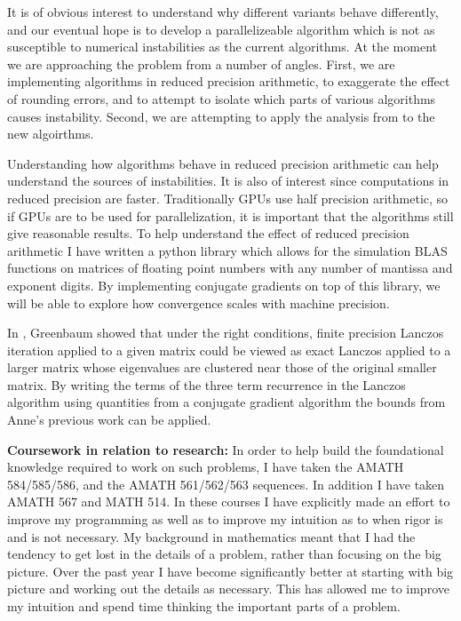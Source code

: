 \documentclass[11pt]{article}
\begin{document}
It is of obvious interest to understand why different variants behave differently, and our eventual hope is to develop a parallelizeable algorithm which is not as susceptible to numerical instabilities as the current algorithms. At the moment we are approaching the problem from a number of angles. First, we are implementing algorithms in reduced precision arithmetic, to exaggerate the effect of rounding errors, and to attempt to isolate which parts of various algorithms causes instability. Second, we are attempting to apply the analysis from \cite{perturbed_lanczos} to the new algoirthms.

Understanding how algorithms behave in reduced precision arithmetic can help understand the sources of instabilities. It is also of interest since computations in reduced precision are faster. Traditionally GPUs use half precision arithmetic, so if GPUs are to be used for parallelization, it is important that the algorithms still give reasonable results. To help understand the effect of reduced precision arithmetic I have written a python library which allows for the simulation BLAS functions on matrices of floating point numbers with any number of mantissa and exponent digits. By implementing conjugate gradients on top of this library, we will be able to explore how convergence scales with machine precision.


In \cite{perturbed_lanczos}, Greenbaum showed that under the right conditions, finite precision Lanczos iteration applied to a given matrix could be viewed as exact Lanczos applied to a larger matrix whose eigenvalues are clustered near those of the original smaller matrix. By writing the terms of the three term recurrence in the Lanczos algorithm using quantities from a conjugate gradient algorithm the bounds from Anne's previous work can be applied.



\textbf{Coursework in relation to research:}
In order to help build the foundational knowledge required to work on such problems, I have taken the AMATH 584/585/586, and the AMATH 561/562/563 sequences. In addition I have taken AMATH 567 and MATH 514. In these courses I have explicitly made an effort to improve my programming as well as to improve my intuition as to when rigor is and is not necessary. My background in mathematics meant that I had the tendency to get lost in the details of a problem, rather than focusing on the big picture. Over the past year I have become significantly better at starting with big picture and working out the details as necessary. This has allowed me to improve my intuition and spend time thinking the important parts of a problem.
\end{document}
